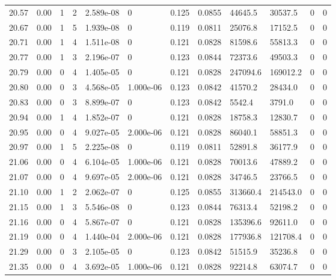 \documentclass[preview]{standalone}
\begin{document}
{{{{{{\begin{tabular}{L{1.2cm}C{1.2cm} C{0.3cm}C{0.5cm} C{1.4cm}C{1.4cm} C{1.4cm}C{1.4cm} C{1.6cm}C{1.6cm} C{1.6cm}C{1.6cm}}
  20.57  &  0.00  & 1     &  2 &  2.589e-08  & 0  &  0.125&   0.0855& 44645.5 & 30537.5   &  0 & 0  \\ 
  20.67  &  0.00  & 1     &  5 &  1.939e-08  & 0  &  0.119&   0.0811& 25076.8 & 17152.5   &  0 & 0  \\ 
  20.71  &  0.00  & 1     &  4 &  1.511e-08  & 0  &  0.121&   0.0828& 81598.6 & 55813.3   &  0 & 0  \\ 
  20.77  &  0.00  & 1     &  3 &  2.196e-07  & 0  &  0.123&   0.0844& 72373.6 & 49503.3   &  0 & 0  \\ 
  20.79  &  0.00  & 0     &  4 &  1.405e-05  & 0  &  0.121&   0.0828& 247094.6 & 169012.2   &  0 & 0  \\ 
  20.80  &  0.00  & 0     &  3 &  4.568e-05  & 1.000e-06  &  0.123&   0.0842& 41570.2 & 28434.0   &  0 & 0  \\ 
  20.83  &  0.00  & 0     &  3 &  8.899e-07  & 0  &  0.123&   0.0842& 5542.4 & 3791.0   &  0 & 0  \\ 
  20.94  &  0.00  & 1     &  4 &  1.852e-07  & 0  &  0.121&   0.0828& 18758.3 & 12830.7   &  0 & 0  \\ 
  20.95  &  0.00  & 0     &  4 &  9.027e-05  & 2.000e-06  &  0.121&   0.0828& 86040.1 & 58851.3   &  0 & 0  \\ 
  20.97  &  0.00  & 1     &  5 &  2.225e-08  & 0  &  0.119&   0.0811& 52891.8 & 36177.9   &  0 & 0  \\ 
  21.06  &  0.00  & 0     &  4 &  6.104e-05  & 1.000e-06  &  0.121&   0.0828& 70013.6 & 47889.2   &  0 & 0  \\ 
  21.07  &  0.00  & 0     &  4 &  9.697e-05  & 2.000e-06  &  0.121&   0.0828& 34746.5 & 23766.5   &  0 & 0  \\ 
  21.10  &  0.00  & 1     &  2 &  2.062e-07  & 0  &  0.125&   0.0855& 313660.4 & 214543.0   &  0 & 0  \\ 
  21.15  &  0.00  & 1     &  3 &  5.546e-08  & 0  &  0.123&   0.0844& 76313.4 & 52198.2   &  0 & 0  \\ 
  21.16  &  0.00  & 0     &  4 &  5.867e-07  & 0  &  0.121&   0.0828& 135396.6 & 92611.0   &  0 & 0  \\ 
  21.19  &  0.00  & 0     &  4 &  1.440e-04  & 2.000e-06  &  0.121&   0.0828& 177936.8 & 121708.4   &  0 & 0  \\ 
  21.29  &  0.00  & 0     &  3 &  2.105e-05  & 0  &  0.123&   0.0842& 51515.9 & 35236.8   &  0 & 0  \\ 
  21.35  &  0.00  & 0     &  4 &  3.692e-05  & 1.000e-06  &  0.121&   0.0828& 92214.8 & 63074.7   &  0 & 0  \\ 

\end{tabular}}}}}}}
\end{document}
